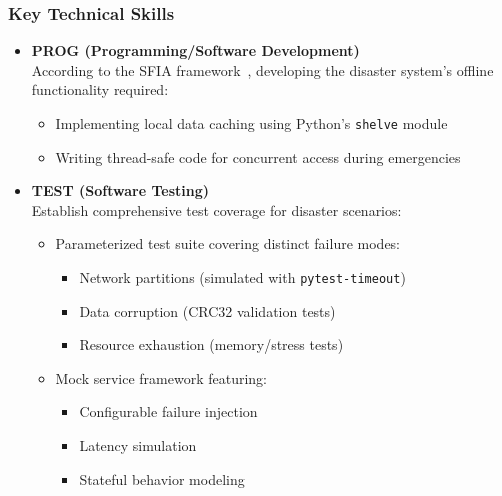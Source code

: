 \documentclass[a4paper, 11pt]{report}
\begin{document}
\subsubsection{Key Technical Skills}
\begin{itemize}
    \item \textbf{PROG (Programming/Software Development)} \\
    According to the SFIA framework~\cite{sfia}, developing the disaster system's offline functionality required:
    \begin{itemize}
        \item Implementing local data caching using Python's \texttt{shelve} module
        \item Writing thread-safe code for concurrent access during emergencies
    \end{itemize}

    \item \textbf{TEST (Software Testing)} \\
    Establish comprehensive test coverage for disaster scenarios:
    \begin{itemize}
        \item Parameterized test suite covering distinct failure modes:
        \begin{itemize}
            \item Network partitions (simulated with \texttt{pytest-timeout})
            \item Data corruption (CRC32 validation tests)
            \item Resource exhaustion (memory/stress tests)
        \end{itemize}

        \item Mock service framework featuring:
        \begin{itemize}
            \item Configurable failure injection 
            \item Latency simulation 
            \item Stateful behavior modeling
        \end{itemize}
    \end{itemize}
\end{itemize}
\end{document}

